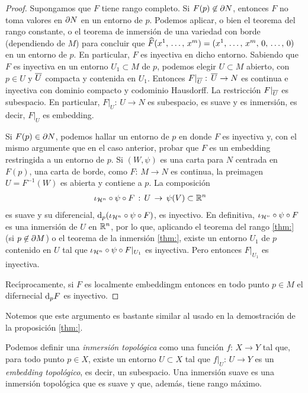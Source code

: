 \begin{proof}
	Supongamos que $F$ tiene rango completo. Si $F(p)\not\in\borde[N]$,
	entonces $F$ no toma valores en $\borde[N]$ en un entorno de $p$.
	Podemos aplicar, o bien el teorema del rango constante, o el
	teorema de inmersi\'{o}n de una variedad con borde (dependiendo de
	$M$) para concluir que
	$\widehat{F}(\lista*{x}{m})=(\lista*{x}{m},\,0,\,\dots,\,0)$
	en un entorno de $p$. En particular, $F$ es inyectiva en dicho
	entorno. Sabiendo que $F$ es inyectiva en un entorno
	$U_{1}\subset M$ de $p$, podemos elegir $U\subset M$ abierto,
	con $p\in U$ y $\clos{U}$ compacta y contenida en $U_{1}$.
	Entonces $F|_{\clos{U}}:\,\clos{U}\rightarrow N$ es continua
	e inyectiva con dominio compacto y codominio Hausdorff. La
	restricci\'{o}n $F|_{\clos{U}}$ es subespacio. En particular,
	$F|_{U}:\,U\rightarrow N$ es subespacio, es suave y es inmersi\'{o}n,
	es decir, $F|_{U}$ es embedding.

	Si $F(p)\in\borde[N]$, podemos hallar un entorno de $p$ en donde $F$
	es inyectiva y, con el mismo argumente que en el caso anterior,
	probar que $F$ es un embedding restringida a un entorno de $p$.
	Si $(W,\psi)$ es una carta para $N$ centrada en $F(p)$, una
	carta de borde, como $F:\,M\rightarrow N$ es continua, la preimagen
	$U=F^{-1}(W)$ es abierta y contiene a $p$. La composici\'{o}n
	\begin{align*}
		\inc[{\hemi[n]}]\circ\psi\circ F & \,:\,
			U\,\rightarrow\,\psi(V)\subset\bb{R}^{n}
	\end{align*}
	es suave y su diferencial,
	$\diferencial[p]{(\inc[{\hemi[n]}]\circ\psi\circ F)}$, es inyectivo.
	En definitiva, $\inc[{\hemi[n]}]\circ\psi\circ F$ es una
	inmersi\'{o}n de $U$ en $\bb{R}^{n}$, por lo que, aplicando el
	teorema del rango \ref{thm:} (si $p\not\in\borde[M]$) o el teorema
	de la inmersi\'{o}n \ref{thm:}, existe un entorno $U_{1}$ de $p$
	contenido en $U$ tal que $\inc[{\hemi[n]}]\circ\psi\circ F|_{U_{1}}$
	es inyectiva. Pero entonces $F|_{U_{1}}$ es inyectiva.

	Rec\'{\i}procamente, si $F$ es localmente embeddingm entonces
	en todo punto $p\in M$ el difernecial $\diferencial[p]{F}$ es
	inyectivo.
\end{proof}

\begin{obsEmbeddingLocal}\label{obs:embeddinglocal}
	Notemos que este argumento es bastante similar al usado en la
	demostraci\'{o}n de la proposici\'{o}n \ref{thm:}.
\end{obsEmbeddingLocal}

Podemos definir una \emph{inmersi\'{o}n topol\'{o}gica} como una
funci\'{o}n $f:\,X\rightarrow Y$ tal que, para todo punto $p\in X$,
existe un entorno $U\subset X$ tal que $f|_{U}:\,U\rightarrow Y$ es
un \emph{embedding topol\'{o}gico}, es decir, un subespacio. Una inmersi\'{o}n
suave es una inmersi\'{o}n topol\'{o}gica que es suave y que, adem\'{a}s,
tiene rango m\'{a}ximo.

